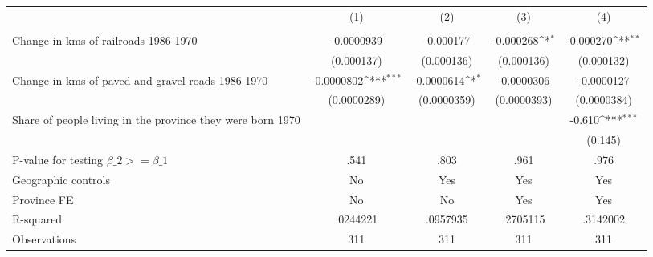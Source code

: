 {
\def\sym#1{\ifmmode^{#1}\else\(^{#1}\)\fi}
\begin{tabular}{l*{4}{c}}
\hline\hline
                &\multicolumn{1}{c}{(1)}&\multicolumn{1}{c}{(2)}&\multicolumn{1}{c}{(3)}&\multicolumn{1}{c}{(4)}\\
                &\multicolumn{1}{c}{}&\multicolumn{1}{c}{}&\multicolumn{1}{c}{}&\multicolumn{1}{c}{}\\
\hline
Change in kms of railroads 1986-1970&-0.0000939         &-0.000177         &-0.000268\sym{*}  &-0.000270\sym{**} \\
                &(0.000137)         &(0.000136)         &(0.000136)         &(0.000132)         \\
[1em]
Change in kms of paved and gravel roads 1986-1970&-0.0000802\sym{***}&-0.0000614\sym{*}  &-0.0000306         &-0.0000127         \\
                &(0.0000289)         &(0.0000359)         &(0.0000393)         &(0.0000384)         \\
[1em]
Share of people living in the province they were born 1970&                  &                  &                  &   -0.610\sym{***}\\
                &                  &                  &                  &  (0.145)         \\
\hline
P-value for testing $\beta\_{2} >= \beta\_{1}$&     .541         &     .803         &     .961         &     .976         \\
Geographic controls&       No         &      Yes         &      Yes         &      Yes         \\
Province FE     &       No         &       No         &      Yes         &      Yes         \\
R-squared       & .0244221         & .0957935         & .2705115         & .3142002         \\
Observations    &      311         &      311         &      311         &      311         \\
\hline\hline
\end{tabular}
}
